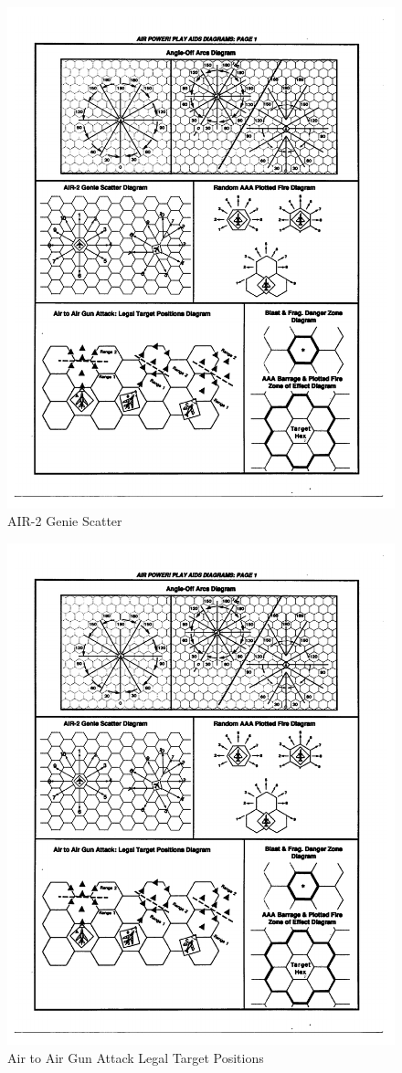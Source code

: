 \documentclass[10pt]{article}
\begin{document}
\begin{figure}
\centering
\caption{AIR-2 Genie Scatter}
\medskip
\includegraphics[width=0.5\linewidth]{figures/aids-genie-scatter.pdf}
\end{figure}

\begin{figure}
\centering
\caption{Air to Air Gun Attack Legal Target Positions}
\medskip
\includegraphics[width=0.4\linewidth]{figures/aids-gun-attack.pdf}
\end{figure}
\end{document}
